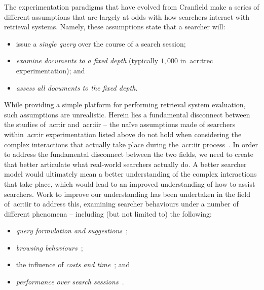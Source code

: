 The experimentation paradigms that have evolved from Cranfield make a series of different assumptions that are largely at odds with how searchers interact with retrieval systems. Namely, these assumptions state that a searcher will:

\vspace*{-3mm}
\begin{itemize}
    \item{issue a \emph{single query} over the course of a search session;}
    \item{\emph{examine documents to a fixed depth} (typically $1,000$ in~\gls{acr:trec} experimentation); and}
    \item{\emph{assess all documents to the fixed depth.}}
\end{itemize}
\vspace*{-3mm}

While providing a simple platform for performing retrieval system evaluation, such assumptions are unrealistic. Herein lies a fundamental disconnect between the studies of~\gls{acr:ir} and~\gls{acr:iir} -- the na\"{i}ve assumptions made of searchers within~\gls{acr:ir} experimentation listed above do not hold when considering the complex interactions that actually take place during the~\gls{acr:iir} process~\citep{ingwersen2005theturn}. In order to address the fundamental disconnect between the two fields, we need to create  that better articulate what real-world searchers actually do. A better searcher model would ultimately mean a better understanding of the complex interactions that take place, which would lead to an improved understanding of how to assist searchers. Work to improve our understanding has been undertaken in the field of~\gls{acr:iir} to address this, examining searcher behaviours under a number of different phenomena -- including (but not limited to) the following:
\vspace*{-2mm}
\begin{itemize}
    \item{\emph{query formulation and suggestions}~\citep{azzopardi2009query_side, azzopardi2007languages, baskaya2013behavioural_factors, carterette2015test_collections, jordan2006cqg, keskustalo2009querying, verberne2015personalised_queries};}
    \item{\emph{browsing behaviours}~\citep{carterette2015test_collections, chuklin2015click_models, guo2009click_chain, pakkonen2015behavioural_dimensions, smucker2011user_strategies};}
    \item{the influence of \emph{costs and time}~\citep{azzopardi2011economics, baskaya2013behavioural_factors}; and}
    \item{\emph{performance over search sessions}~\citep{luo2014winwin, luo2015pomdp}.}
\end{itemize}
\vspace*{-2mm}

